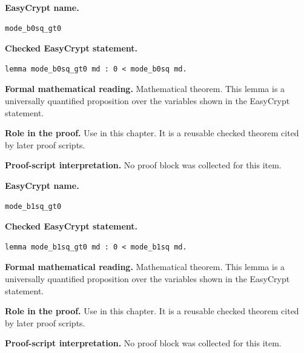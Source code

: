 \begin{formaltheorem}
\noindent\textbf{EasyCrypt name.}
\begin{lstlisting}[language=EasyCrypt,basicstyle=\ttfamily\scriptsize]
mode_b0sq_gt0
\end{lstlisting}
\noindent\textbf{Checked EasyCrypt statement.}
\begin{lstlisting}[language=EasyCrypt,basicstyle=\ttfamily\scriptsize]
lemma mode_b0sq_gt0 md : 0 < mode_b0sq md.
\end{lstlisting}
\noindent\textbf{Formal mathematical reading.}
Mathematical theorem. This lemma is a universally quantified proposition over the variables shown in the EasyCrypt statement.

\noindent\textbf{Role in the proof.}
Use in this chapter. It is a reusable checked theorem cited by later proof scripts.

\noindent\textbf{Proof-script interpretation.}
No proof block was collected for this item.

\end{formaltheorem}

\begin{formaltheorem}
\noindent\textbf{EasyCrypt name.}
\begin{lstlisting}[language=EasyCrypt,basicstyle=\ttfamily\scriptsize]
mode_b1sq_gt0
\end{lstlisting}
\noindent\textbf{Checked EasyCrypt statement.}
\begin{lstlisting}[language=EasyCrypt,basicstyle=\ttfamily\scriptsize]
lemma mode_b1sq_gt0 md : 0 < mode_b1sq md.
\end{lstlisting}
\noindent\textbf{Formal mathematical reading.}
Mathematical theorem. This lemma is a universally quantified proposition over the variables shown in the EasyCrypt statement.

\noindent\textbf{Role in the proof.}
Use in this chapter. It is a reusable checked theorem cited by later proof scripts.

\noindent\textbf{Proof-script interpretation.}
No proof block was collected for this item.

\end{formaltheorem}

